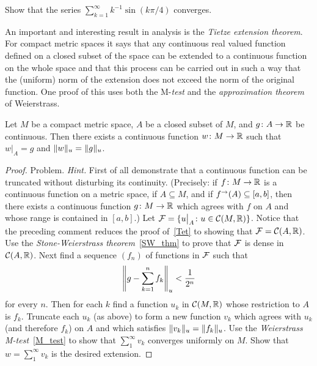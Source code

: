 \begin{prob} Show that the series $\sum_{k=1}^\infty k^{-1}\sin(k\pi/4)$ converges.
\end{prob}

An important and interesting result in analysis is the \emph{Tietze extension theorem}.  For
compact metric spaces it says that any continuous real valued function defined on a closed
subset of the space can be extended to a continuous function on the whole space and that this
process can be carried out in such a way that the (uniform) norm of the extension does not
exceed the norm of the original function.  One proof of this uses both the M-\emph{test} and
the \emph{approximation theorem} of Weierstrass.

\begin{thm}\label{Tet}
Let $M$ be a compact metric space, $A$ be a closed subset of $M$, and $g\colon A \rightarrow \mathbb{R}$ be
continuous.  Then there exists a continuous function $w\colon M \rightarrow \mathbb{R}$ such that $w\big|_A =
g$ and $\lVert w\rVert_u = \lVert g\rVert_u$.
\end{thm}

\begin{proof} Problem.   \emph{Hint.}  First of all demonstrate that a continuous function can
be truncated without disturbing its continuity.  (Precisely: if $f \colon M \rightarrow \mathbb{R}$ is a
continuous function on a metric space, if $A \subseteq M$, and if $f^{\rightarrow}(A) \subseteq
[a,b]$, then there exists a continuous function $g \colon M \rightarrow \mathbb{R}$ which agrees with $f$ on
$A$ and whose range is contained in $[a,b]$.) Let $\mathcal{F} = \{u\big|_A \colon  u \in \mathcal{C}(M,\mathbb{R})\}$. Notice that the preceding comment reduces the proof of~\ref{Tet} to showing that
$\mathcal{F} = \mathcal{C}(A,\mathbb{R})$.  Use the \emph{Stone-Weierstrass theorem}~\ref{SW_thm} to prove that
$\mathcal{F}$ is dense in $\mathcal{C}(A,\mathbb{R})$.  Next find a sequence $(f_n)$ of functions in $\mathcal{F}$
such that
  \[ \left\lVert g - \sum_{k=1}^n f_k\right\rVert_u < \frac1{2^n} \]
for every $n$.  Then for each $k$ find a function $u_k$ in $\mathcal{C}(M,\mathbb{R})$ whose restriction to
$A$ is $f_k$.  Truncate each $u_k$ (as above) to form a new function $v_k$ which agrees with
$u_k$ (and therefore $f_k$) on $A$ and which satisfies $\lVert v_k\rVert_u = \lVert f_k\rVert_u$.  Use the
\emph{Weierstrass M-test}~\ref{M_test} to show that $\sum_1^{\infty}v_k$ converges uniformly
on $M$. Show that $w = \sum_1^{\infty}v_k$ is the desired extension.   \ns
\end{proof}

